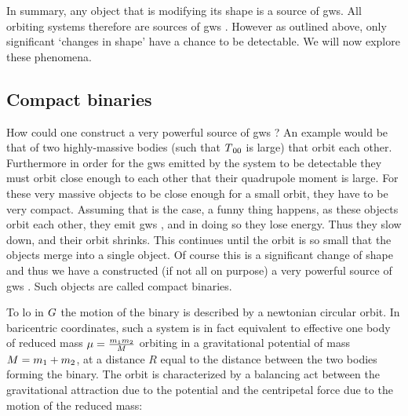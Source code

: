 \documentclass[
  11pt,
  a4paper,
  DIV=11,
  numbers=noendperiod,
  twoside]{scrreprt}
\DeclareRobustCommand{\[}{\begin{equation}}
\DeclareRobustCommand{\]}{\end{equation}}
\begin{document}
In summary, any object that is modifying its shape is a source of
\glspl{gw}. All orbiting systems therefore are sources of \glspl{gw} .
However as outlined above, only significant `changes in shape' have a
chance to be detectable. We will now explore these phenomena.

\hypertarget{sec-compactbinaries}{%
\subsection{Compact binaries}\label{sec-compactbinaries}}

How could one construct a very powerful source of \glspl{gw} ? An
example would be that of two highly-massive bodies (such that
\(\SEco[00]\) is large) that orbit each other. Furthermore in order for
the \glspl{gw} emitted by the system to be detectable they must orbit
close enough to each other that their quadrupole moment is large. For
these very massive objects to be close enough for a small orbit, they
have to be very compact. Assuming that is the case, a funny thing
happens, as these objects orbit each other, they emit \glspl{gw} , and
in doing so they lose energy. Thus they slow down,
and their orbit shrinks. This continues until the orbit is so small that
the objects merge into a single object. Of course this is a significant
change of shape and thus we have a constructed (if not all on purpose) a
very powerful source of \glspl{gw} . Such objects are called compact
binaries.

To \gls{lo} in \(\grav\) the motion of the binary is described by a
newtonian circular orbit. In baricentric coordinates, such a system is
in fact equivalent to effective one body  of reduced mass
\(\redmass=\frac{\mass[1]\mass[2]}{\totmass}\) orbiting in a
gravitational potential of mass \(\totmass=\mass[1]+\mass[2]\), at a
distance \(R\) equal to the distance between the two bodies forming the
binary. The orbit is characterized by a balancing act between the
gravitational attraction due to the potential and the centripetal force
due to the motion of the reduced mass:
\end{document}

